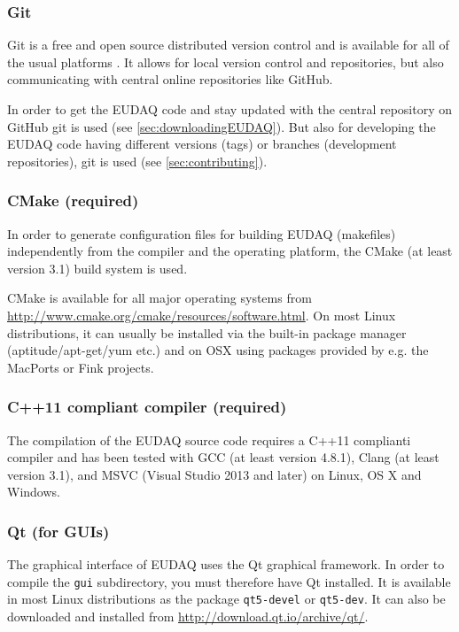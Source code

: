 \subsubsection{Git}
Git is a free and open source distributed version control and is available for all of the usual platforms \cite{gitWWW}. 
It allows for local version control and repositories, but also communicating with central online repositories like GitHub.
   
In order to get the EUDAQ code and stay updated with the central repository on GitHub git is used (see \autoref{sec:downloadingEUDAQ}).
But also for developing the EUDAQ code having different versions (tags) or branches (development repositories), git is used (see \autoref{sec:contributing}).


\subsubsection{CMake (required)}
In order to generate configuration files for building EUDAQ (makefiles) independently from the compiler and the operating platform, the CMake (at least version 3.1) build system is used.

CMake is available for all major operating systems from \url{http://www.cmake.org/cmake/resources/software.html}. 
On most Linux distributions, it can usually be installed via the built-in package manager (aptitude/apt-get/yum etc.) and on OSX using packages provided by e.g. the MacPorts or Fink projects.

\subsubsection{C++11 compliant compiler (required)}
The compilation of the EUDAQ source code requires a C++11 complianti compiler and has been tested with GCC (at least version 4.8.1), Clang (at least version 3.1), and MSVC (Visual Studio 2013 and later) on Linux, OS X and Windows.

\subsubsection{Qt (for GUIs)}
The graphical interface of EUDAQ uses the Qt graphical framework.
In order to compile the \texttt{gui} subdirectory, you must therefore have Qt installed.
It is available in most Linux distributions as the package \texttt{qt5-devel} or \texttt{qt5-dev}.
It can also be downloaded and installed from \url{http://download.qt.io/archive/qt/}. 

